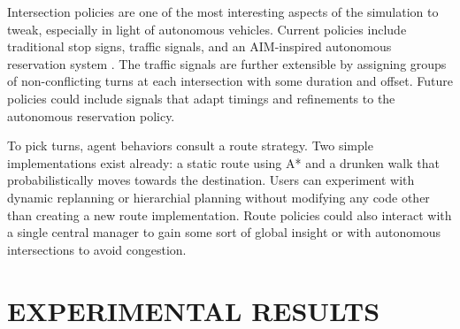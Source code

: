 \documentclass[letterpaper, 10 pt, conference]{ieeeconf}  %
\begin{document}
Intersection policies are one of the most interesting aspects of the simulation
to tweak, especially in light of autonomous vehicles. Current policies include
traditional stop signs, traffic signals, and an AIM-inspired autonomous
reservation system \cite{JAIR08-dresner}. The traffic signals are further
extensible by assigning groups of non-conflicting turns at each intersection
with some duration and offset. Future policies could include signals that adapt
timings and refinements to the autonomous reservation policy.

To pick turns, agent behaviors consult a route strategy. Two simple
implementations exist already: a static route using A* \cite{astar} and a
drunken walk that probabilistically moves towards the destination. Users can
experiment with dynamic replanning or hierarchial planning
\cite{Botea04nearoptimal} without modifying any code other than creating a new
route implementation. Route policies could also interact with a single central
manager to gain some sort of global insight or with autonomous intersections to
avoid congestion.


\section{EXPERIMENTAL RESULTS}
\label{sec:results}
\end{document}
